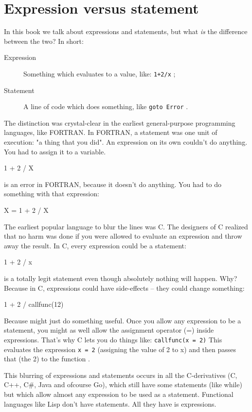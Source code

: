 \section{Expression versus statement}
\label{sec:expression versus statement}
In this book we talk about expressions and statements, but%
what \emph{is} the difference between the two?
In short:
\begin{description}
\item[Expression] Something which evaluates to a value, like:
\lstinline{1+2/x} ;
\item[Statement] A line of code which does something, like
\lstinline{goto Error} .
\end{description}

The distinction was crystal-clear in the earliest general-purpose
programming languages, like FORTRAN. In FORTRAN, a statement was one
unit of execution: "a thing that you did". 
An expression on its own couldn't do anything. You had to assign it to a
variable.
\begin{display}
1 + 2 / X
\end{display}
\noindent{}is an error in FORTRAN, because it doesn't do anything. You had to do
something with that expression: 
\begin{display}{X = 1 + 2 / X}\end{display}

\newpage

The earliest popular language to blur the lines was C. The designers of
C realized that no harm was done if you were allowed to evaluate an
expression and throw away the result. In C, every expression could be a
statement: 
\begin{display}1 + 2 / x\end{display}
\noindent{}is a totally legit statement even though absolutely nothing will happen.
Why? Because in C, expressions could have side-effects -- they could
change something: \begin{display}{1 + 2 / callfunc(12)}\end{display}

\noindent{}Because  might just do something useful.
Once you allow any expression to be a statement, you might as well allow
the assignment operator (=) inside expressions. That's why C lets you do
things like: \lstinline{callfunc(x = 2)}
This evaluates the expression \lstinline{x = 2} (assigning the value of 2 to x) and
then passes that (the 2) to the function .

This blurring of expressions and statements occurs in all the
C-derivatives (C, C++, C\#, Java and ofcourse Go), which still have some
statements (like while) but which allow almost any expression to be used
as a statement. Functional languages like Lisp don't have statements.
All they have is expressions. 
